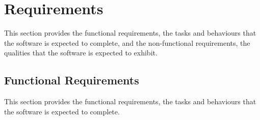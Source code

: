 \documentclass[12pt]{article}
\begin{document}
\section{Requirements} \label{Sec:Requirements}

This section provides the functional requirements, the tasks and behaviours that
the software is expected to complete, and the non-functional requirements, the
qualities that the software is expected to exhibit.

\subsection{Functional Requirements} \label{Sec:FRs}

This section provides the functional requirements, the tasks and behaviours that
the software is expected to complete.
\end{document}

